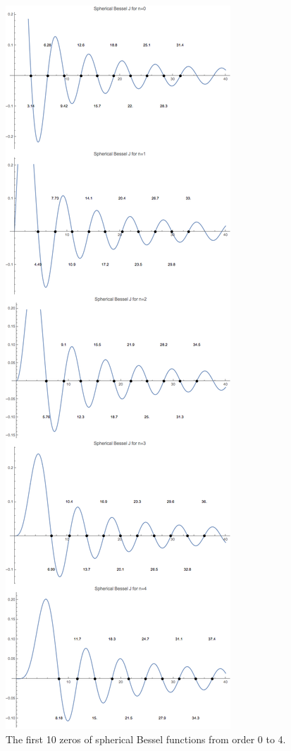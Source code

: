 \documentclass[letterpaper,10pt,english]{sphinxmanual}
\begin{document}
\begin{figure}[htbp]
\centering
\capstart

\includegraphics{sphericalBesselZeros.png}
\caption{The first 10 zeros of spherical Bessel functions from order 0 to 4.}\end{figure}
\end{document}
